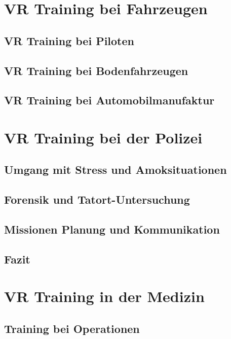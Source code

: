 \documentclass[
    12pt,
    a4paper,
    doubleside,
    BCOR=10mm,
    parskip=half,
    ngerman
]{scrbook}
\begin{document}
\chapter{VR Training bei Fahrzeugen}\label{sec:Fahrzeugen}

\section{VR Training bei Piloten}\label{sec:Piloten}

\section{VR Training bei Bodenfahrzeugen}\label{sec:Bodenfahrzeugen}

\section{VR Training bei Automobilmanufaktur}\label{sec:Automobilmanufaktur}

\chapter{VR Training bei der Polizei}\label{sec:polizei}

\section{Umgang mit Stress und Amoksituationen}\label{sec:polizei-SuA}

\section{Forensik und Tatort-Untersuchung}\label{sec:polizei-FuT}

\section{Missionen Planung und Kommunikation}\label{sec:polizei-PuK}

\section{Fazit}\label{sec:polizei-Fazit}

\chapter{VR Training in der Medizin}\label{sec:medizin}

\section{Training bei Operationen}\label{sec:Operationen}

\end{document}
